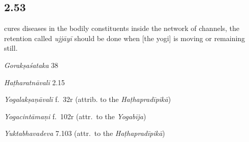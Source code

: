 \begin{ekdosis}
\subsection*{2.53}
\begin{translation}[hp02_053]
[and] cures diseases in the bodily constituents inside the network of channels,
the retention called \emph{ujjāyī} should be done when [the yogi] is moving or remaining still.
\end{translation}

\begin{sources}[hp02_053]
\emph{Gorakṣaśataka} 38

\begin{versinnote}
\end{versinnote}
\end{sources}

\begin{testimonia}[hp02_053]
\emph{Haṭharatnāvalī} 2.15

\begin{versinnote}
\tl{nāḍījālodarādhātu° ] nāḍījalodaradhātu° \textup{J,P;} nāḍījalodaraṃ dhātu° \textup{N, n1, n4}\\+}
\end{versinnote}

\emph{Yogalakṣaṇāvalī} f.~32r (attrib. to the \emph{Haṭhapradīpikā})
\begin{versinnote}
\end{versinnote}

\emph{Yogacintāmaṇi} f.~102r (attr.~to the \emph{Yogabīja})

\begin{versinnote}
\end{versinnote}

\emph{Yuktabhavadeva} 7.103 (attr.~to the \emph{Haṭhapradīpikā})


\end{testimonia}
\end{ekdosis}
